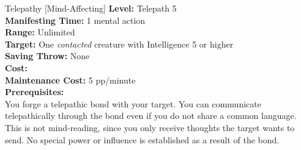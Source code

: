 {Telepathy [Mind-Affecting]}
{
	\textbf{Level:}
	Telepath 5\\
	\textbf{Manifesting Time:}
	1 mental action\\
	\textbf{Range:}
	Unlimited\\
	\textbf{Target:}
	One \emph{contacted} creature with Intelligence 5 or higher\\
	\textbf{Saving Throw:}
	None\\
	\textbf{Cost:}
	\\
	\textbf{Maintenance Cost:}
	5 pp/minute\\
	\textbf{Prerequisites:}
	\\
}
{
	You forge a telepathic bond with your target. You can communicate telepathically through the bond even if you do not share a common language. This is not mind-reading, since you only receive thoughts the target wants to send. No special power or influence is established as a result of the bond.
}